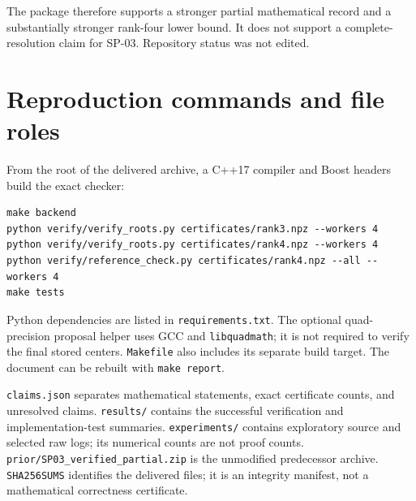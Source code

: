 \documentclass[11pt]{article}
\theoremstyle{remark}\newtheorem{remark}[theorem]{Remark}
\begin{document}
The package therefore supports a stronger partial mathematical record and a substantially stronger rank-four lower bound. It does not support a complete-resolution claim for SP-03. Repository status was not edited.

\appendix
\section{Reproduction commands and file roles}
From the root of the delivered archive, a C++17 compiler and Boost headers build the exact checker:
\begin{verbatim}
make backend
python verify/verify_roots.py certificates/rank3.npz --workers 4
python verify/verify_roots.py certificates/rank4.npz --workers 4
python verify/reference_check.py certificates/rank4.npz --all --workers 4
make tests
\end{verbatim}
Python dependencies are listed in \texttt{requirements.txt}. The optional quad-precision proposal helper uses GCC and \texttt{libquadmath}; it is not required to verify the final stored centers. \texttt{Makefile} also includes its separate build target. The document can be rebuilt with \texttt{make report}.

\texttt{claims.json} separates mathematical statements, exact certificate counts, and unresolved claims. \texttt{results/} contains the successful verification and implementation-test summaries. \texttt{experiments/} contains exploratory source and selected raw logs; its numerical counts are not proof counts. \texttt{prior/SP03\_verified\_partial.zip} is the unmodified predecessor archive. \texttt{SHA256SUMS} identifies the delivered files; it is an integrity manifest, not a mathematical correctness certificate.
\end{document}
